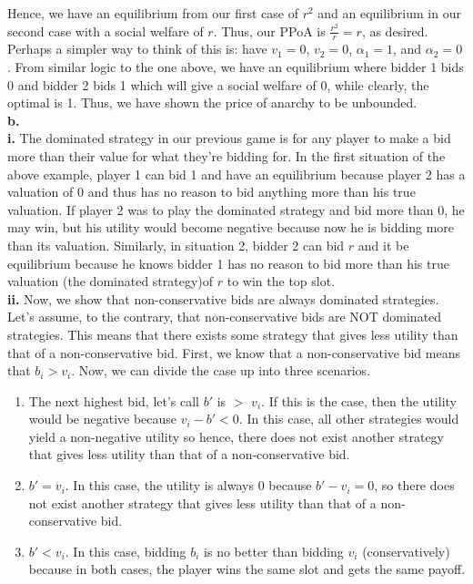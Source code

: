 \documentclass[12 pt]{article}
\begin{document}
	
	\noindent Hence, we have an equilibrium from our first case of $r^2$ and an equilibrium in our second case with a social welfare of $r$. Thus, our PPoA is $\frac{r^2}{r} = r$, as desired. \\
	
	\noindent Perhaps a simpler way to think of this is: have $v_1 = 0$, $v_2 = 0$, $\alpha_1 = 1$, and $\alpha_2 = 0$. From similar logic to the one above, we have an equilibrium where bidder 1 bids 0 and bidder 2 bids 1 which will give a social welfare of 0, while clearly, the optimal is 1. Thus, we have shown the price of anarchy to be unbounded. \\
	
	\noindent \textbf{b.} \\
	
	\noindent \textbf {i.} The dominated strategy in our previous game is for any player to make a bid more than their value for what they're bidding for. In the first situation of the above example, player 1 can bid 1 and have an equilibrium because player 2 has a valuation of 0 and thus has no reason to bid anything more than his true valuation. If player 2 was to play the dominated strategy and bid more than 0, he may win, but his utility would become negative because now he is bidding more than its valuation. Similarly, in situation 2, bidder 2 can bid $r$ and it be equilibrium because he knows bidder 1 has no reason to bid more than his true valuation (the dominated strategy)of $r$ to win the top slot. \\
	
	\noindent \textbf{ii.} Now, we show that non-conservative bids are always dominated strategies. Let's assume, to the contrary, that non-conservative bids are NOT dominated strategies. This means that there exists some strategy that gives less utility than that of a non-conservative bid. First, we know that a non-conservative bid means that $b_i > v_i$. Now, we can divide the case up into three scenarios.
	
	\begin{enumerate}
		\item The next highest bid, let's call $b'$ is $>$ $v_i$. If this is the case, then the utility would be negative because $v_i - b' < 0$. In this case, all other strategies would yield a non-negative utility so hence, there does not exist another strategy that gives less utility than that of a non-conservative bid.
		\item $b' = v_i$. In this case, the utility is always 0 because $b' - v_i = 0$, so there does not exist another strategy that gives less utility than that of a non-conservative bid.
		\item $b' < v_i$. In this case, bidding $b_i$ is no better than bidding $v_i$ (conservatively) because in both cases, the player wins the same slot and gets the same payoff. 
	\end{enumerate}
\end{document}
